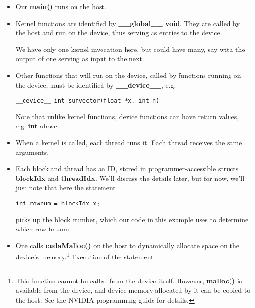 \begin{itemize}

\item Our {\bf main()} runs on the host.  

\item Kernel functions are identified by {\bf \_\_global\_\_ void}.
They are called by the host and run on the device, thus serving as
entries to the device.  

We have only one kernel invocation here, but could have many, say with
the output of one serving as input to the next.

\item Other functions that will run on the device, called by functions
running on the device, must be identified by {\bf \_\_device\_\_}, e.g.

\begin{Verbatim}[fontsize=\relsize{-2}]
__device__ int sumvector(float *x, int n)
\end{Verbatim}

Note that unlike kernel functions, device functions can have return
values, e.g. {\bf int} above.

\item When a kernel is called, each thread runs it.  Each thread
receives the same arguments. 


\item Each block and thread has an ID, stored in programmer-accessible 
structs {\bf blockIdx} and {\bf threadIdx}.  We'll discuss the 
details later, but for now, we'll just note that here the statement 

\begin{Verbatim}[fontsize=\relsize{-2}]
int rownum = blockIdx.x; 
\end{Verbatim}

picks up the block number, which our code in this example uses to
determine which row to sum.

\item One calls {\bf cudaMalloc()} on the host to dynamically allocate
space on the device's memory.\footnote{This function 
cannot be called from the device itself.   However, {\bf malloc()} is
available from the device, and device memory allocated by it can be
copied to the host.  See the NVIDIA programming guide for details.}
Execution of the statement


\end{itemize}
